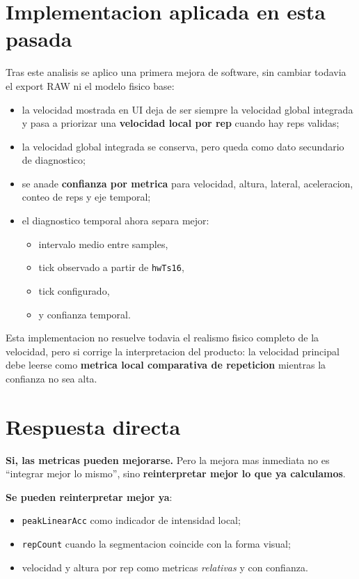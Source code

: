 \documentclass[11pt,a4paper]{article}
\begin{document}
\section{Implementacion aplicada en esta pasada}
Tras este analisis se aplico una primera mejora de software, sin cambiar todavia el export RAW ni el modelo fisico base:
\begin{itemize}[leftmargin=14pt]
  \item la velocidad mostrada en UI deja de ser siempre la velocidad global integrada y pasa a priorizar una \textbf{velocidad local por rep} cuando hay reps validas;
  \item la velocidad global integrada se conserva, pero queda como dato secundario de diagnostico;
  \item se anade \textbf{confianza por metrica} para velocidad, altura, lateral, aceleracion, conteo de reps y eje temporal;
  \item el diagnostico temporal ahora separa mejor:
  \begin{itemize}[leftmargin=14pt]
    \item intervalo medio entre samples,
    \item tick observado a partir de \texttt{hwTs16},
    \item tick configurado,
    \item y confianza temporal.
  \end{itemize}
\end{itemize}

Esta implementacion no resuelve todavia el realismo fisico completo de la velocidad, pero si corrige la interpretacion del producto: la velocidad principal debe leerse como \textbf{metrica local comparativa de repeticion} mientras la confianza no sea alta.

\section*{Respuesta directa}
\textbf{Si, las metricas pueden mejorarse.} Pero la mejora mas inmediata no es ``integrar mejor lo mismo'', sino \textbf{reinterpretar mejor lo que ya calculamos}.

\textbf{Se pueden reinterpretar mejor ya}:
\begin{itemize}[leftmargin=14pt]
  \item \texttt{peakLinearAcc} como indicador de intensidad local;
  \item \texttt{repCount} cuando la segmentacion coincide con la forma visual;
  \item velocidad y altura por rep como metricas \emph{relativas} y con confianza.
\end{itemize}
\end{document}
